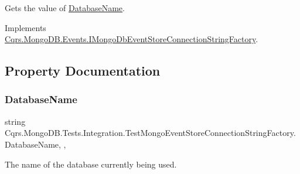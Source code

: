 Gets the value of \hyperlink{classCqrs_1_1MongoDB_1_1Tests_1_1Integration_1_1TestMongoEventStoreConnectionStringFactory_a647bfdbf4eef2cffe60f86e3ac01efac_a647bfdbf4eef2cffe60f86e3ac01efac}{Database\+Name}. 



Implements \hyperlink{interfaceCqrs_1_1MongoDB_1_1Events_1_1IMongoDbEventStoreConnectionStringFactory_a81ee28bfbb0e567b95f2b280bc6fb298_a81ee28bfbb0e567b95f2b280bc6fb298}{Cqrs.\+Mongo\+D\+B.\+Events.\+I\+Mongo\+Db\+Event\+Store\+Connection\+String\+Factory}.



\subsection{Property Documentation}
\mbox{\label{classCqrs_1_1MongoDB_1_1Tests_1_1Integration_1_1TestMongoEventStoreConnectionStringFactory_a647bfdbf4eef2cffe60f86e3ac01efac_a647bfdbf4eef2cffe60f86e3ac01efac}} 
\subsubsection{\texorpdfstring{Database\+Name}{DatabaseName}}
{\footnotesize\ttfamily string Cqrs.\+Mongo\+D\+B.\+Tests.\+Integration.\+Test\+Mongo\+Event\+Store\+Connection\+String\+Factory.\+Database\+Name\hspace{0.3cm}{\ttfamily [static]}, {\ttfamily [get]}, {\ttfamily [set]}}



The name of the database currently being used. 

